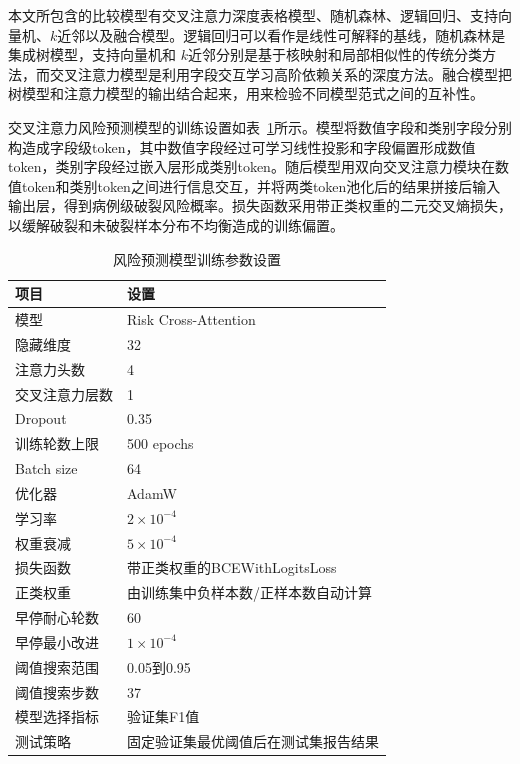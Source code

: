 本文所包含的比较模型有交叉注意力深度表格模型、随机森林、逻辑回归、支持向量机、$k$近邻以及融合模型。逻辑回归可以看作是线性可解释的基线，随机森林是集成树模型，支持向量机和 $k$近邻分别是基于核映射和局部相似性的传统分类方法，而交叉注意力模型是利用字段交互学习高阶依赖关系的深度方法。融合模型把树模型和注意力模型的输出结合起来，用来检验不同模型范式之间的互补性。

交叉注意力风险预测模型的训练设置如表~\ref{tab:risk_train_setup}所示。模型将数值字段和类别字段分别构造成字段级token，其中数值字段经过可学习线性投影和字段偏置形成数值token，类别字段经过嵌入层形成类别token。随后模型用双向交叉注意力模块在数值token和类别token之间进行信息交互，并将两类token池化后的结果拼接后输入输出层，得到病例级破裂风险概率。损失函数采用带正类权重的二元交叉熵损失，以缓解破裂和未破裂样本分布不均衡造成的训练偏置。

\begin{table}[!htbp]
\centering
\caption{风险预测模型训练参数设置}
\label{tab:risk_train_setup}
\small
\renewcommand{\arraystretch}{0.88}
\begin{tabular}{ll}
\toprule
项目 & 设置 \\
\midrule
模型 & Risk Cross-Attention \\
隐藏维度 & 32 \\
注意力头数 & 4 \\
交叉注意力层数 & 1 \\
Dropout & 0.35 \\
训练轮数上限 & 500 epochs \\
Batch size & 64 \\
优化器 & AdamW \\
学习率 & $2\times10^{-4}$ \\
权重衰减 & $5\times10^{-4}$ \\
损失函数 & 带正类权重的BCEWithLogitsLoss \\
正类权重 & 由训练集中负样本数/正样本数自动计算 \\
早停耐心轮数 & 60 \\
早停最小改进 & $1\times10^{-4}$ \\
阈值搜索范围 & 0.05到0.95 \\
阈值搜索步数 & 37 \\
模型选择指标 & 验证集F1值 \\
测试策略 & 固定验证集最优阈值后在测试集报告结果 \\
\bottomrule
\end{tabular}
\normalsize
\renewcommand{\arraystretch}{1}
\end{table}

